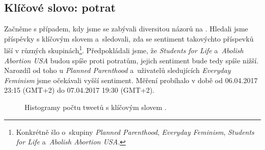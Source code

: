 \documentclass[12pt, a4paper]{article}
\numberwithin{equation}{section} 	%
\begin{document}
\subsection{Klíčové slovo: potrat}\label{subsec:abortion}
\noindent Začněme s případem, kdy jsme se zabývali diversitou názorů na \textit{}. Hledali jsme příspěvky s klíčovým slovem \textit{} a~sledovali, zda se sentiment takovýchto příspevků liší v různých skupinách\footnote{Konkrétně šlo o~skupiny \textit{Planned Parenthood}, \textit{Everyday Feminism}, \textit{Students for Life} a~\textit{Abolish Abortion USA}.}. Předpokládali jsme, že \textit{Students for Life} a~\textit{Abolish Abortion USA} budou spíše proti potratům, jejich sentiment bude tedy spíše nižší. Narozdíl od toho u \textit{Planned Parenthood} a~uživatelů sledujících \textit{Everyday Feminism} jsme očekávali vyšší sentiment. Měření probíhalo v době od 06.04.2017 23:15 (GMT+2) do 07.04.2017 19:30 (GMT+2).
\begin{figure}[!h]
\centering
{}
\caption[]{Histogramy počtu tweetů s klíčovým slovem \textit{}.}
\label{fig:abortion-all}
\end{figure}
\end{document}
